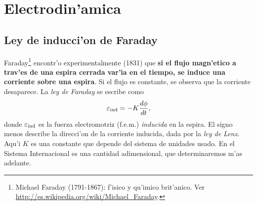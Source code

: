 \chapter{Electrodin'amica}

\section{Ley de inducci'on de Faraday}

Faraday\footnote{Michael Faraday (1791-1867): f'isico y qu'imico brit'anico. Ver \url{http://es.wikipedia.org/wiki/Michael_Faraday}.} encontr'o experimentalmente (1831) que \textbf{si el flujo magn'etico a trav'es de una espira cerrada var'ia en el tiempo, se induce una corriente sobre una espira}. Si el flujo es constante, se observa que la corriente desaparece. La \textit{ley de
Faraday} se escribe como
\begin{equation}\label{faraday}
\varepsilon_{\rm ind}=-K\frac{d\phi}{dt},
\end{equation}
donde $\varepsilon_{\rm ind}$ es la fuerza electromotriz (f.e.m.) \textit{inducida} en la espira. El signo menos describe la direcci'on de la corriente inducida, dada por la \textit{ley de Lenz}. Aqu'i $K$ es una constante que depende del sistema de unidades usado. En el Sistema Internacional es una cantidad adimensional, que determinaremos m'as adelante.


